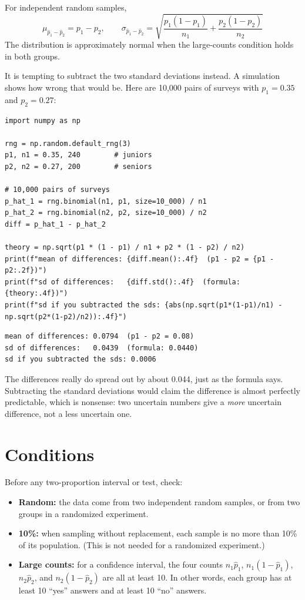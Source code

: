\begin{mdframed}[style = important, frametitle = {Sampling Distribution of $\hat{p}_1 - \hat{p}_2$}]
For independent random samples,
$$\mu_{\hat{p}_1 - \hat{p}_2} = p_1 - p_2, \qquad
\sigma_{\hat{p}_1 - \hat{p}_2} = \sqrt{\frac{p_1(1-p_1)}{n_1} + \frac{p_2(1-p_2)}{n_2}}$$
The distribution is approximately normal when the large-counts condition holds in both groups.
\end{mdframed}

It is tempting to subtract the two standard deviations instead. A simulation shows how
wrong that would be. Here are 10,000 pairs of surveys with $p_1 = 0.35$ and $p_2 = 0.27$:
\begin{verbatim}
import numpy as np

rng = np.random.default_rng(3)
p1, n1 = 0.35, 240        # juniors
p2, n2 = 0.27, 200        # seniors

# 10,000 pairs of surveys
p_hat_1 = rng.binomial(n1, p1, size=10_000) / n1
p_hat_2 = rng.binomial(n2, p2, size=10_000) / n2
diff = p_hat_1 - p_hat_2

theory = np.sqrt(p1 * (1 - p1) / n1 + p2 * (1 - p2) / n2)
print(f"mean of differences: {diff.mean():.4f}  (p1 - p2 = {p1 - p2:.2f})")
print(f"sd of differences:   {diff.std():.4f}  (formula: {theory:.4f})")
print(f"sd if you subtracted the sds: {abs(np.sqrt(p1*(1-p1)/n1) - np.sqrt(p2*(1-p2)/n2)):.4f}")
\end{verbatim}
\begin{verbatim}
mean of differences: 0.0794  (p1 - p2 = 0.08)
sd of differences:   0.0439  (formula: 0.0440)
sd if you subtracted the sds: 0.0006
\end{verbatim}
The differences really do spread out by about 0.044, just as the formula says. Subtracting
the standard deviations would claim the difference is almost perfectly predictable, which is
nonsense: two uncertain numbers give a \emph{more} uncertain difference, not a less uncertain one.

\section{Conditions}
Before any two-proportion interval or test, check:
\begin{itemize}
\item \textbf{Random:} the data come from two independent random samples, or from two groups
in a randomized experiment.
\item \textbf{10\%:} when sampling without replacement, each sample is no more than 10\% of its
population. (This is not needed for a randomized experiment.)
\item \textbf{Large counts:} for a confidence interval, the four counts $n_1\hat{p}_1$,
$n_1(1-\hat{p}_1)$, $n_2\hat{p}_2$, and $n_2(1-\hat{p}_2)$ are all at least 10. In other words,
each group has at least 10 ``yes'' answers and at least 10 ``no'' answers.
\end{itemize}

